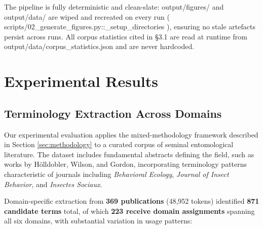 \documentclass[
]{article}
\numberwithin{equation}{section}
\renewcommand{\texttt}[1]{%
    \colorbox{codebg}{\color{codefg}\ttfamily #1}%
}
\begin{document}
The pipeline is fully deterministic and clean-slate:
\texttt{output/figures/} and \texttt{output/data/} are wiped and
recreated on every run
(\texttt{scripts/02\_generate\_figures.py::\_setup\_directories}),
ensuring no stale artefacts persist across runs. All corpus statistics
cited in §3.1 are read at runtime from
\texttt{output/data/corpus\_statistics.json} and are never hardcoded.

\newpage

\section{Experimental Results}\label{sec:experimental_results}

\subsection{Terminology Extraction Across
Domains}\label{terminology-extraction-across-domains}

Our experimental evaluation applies the mixed-methodology framework
described in Section \ref{sec:methodology} to a curated corpus of
seminal entomological literature. The dataset includes fundamental
abstracts defining the field, such as works by Hölldobler, Wilson, and
Gordon, incorporating terminology patterns characteristic of journals
including \emph{Behavioral Ecology}, \emph{Journal of Insect Behavior},
and \emph{Insectes Sociaux}.

Domain-specific extraction from \textbf{369 publications} (48,952
tokens) identified \textbf{871 candidate terms} total, of which
\textbf{223 receive domain assignments} spanning all six domains, with
substantial variation in usage patterns:
\end{document}
